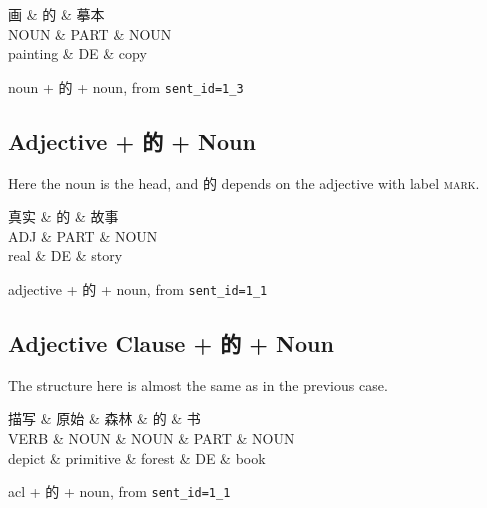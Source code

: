 \documentclass[UTF8,oneside]{book}
\begin{document}
\begin{tree}[h]
\centering
\begin{dependency}[theme=simple]
\begin{deptext}[column sep=.5cm, row sep=.5ex]
画  \& 的  \& 摹本 \\
NOUN \& PART \& NOUN \\
painting \& DE \& copy \\
\end{deptext}
\end{dependency}
\caption{noun + 的 + noun, from \texttt{sent\_id=1\_3}}
\end{tree}

\subsection{Adjective + 的 + Noun}
Here the noun is the head, and 的 depends on the adjective with label \textsc{mark}. 

\begin{tree}[h]
\centering
\begin{dependency}[theme=simple]
\begin{deptext}[column sep=.5cm, row sep=.5ex]
真实  \& 的  \& 故事 \\
ADJ \& PART \& NOUN \\
real \& DE \& story \\
\end{deptext}
\end{dependency}
\caption{adjective + 的 + noun, from \texttt{sent\_id=1\_1}}
\end{tree}

\subsection{Adjective Clause + 的 + Noun}
The structure here is almost the same as in the previous case.

\newpage

\begin{tree}[h]
\centering
\begin{dependency}[theme=simple]
\begin{deptext}[column sep=.5cm, row sep=.5ex]
描写  \& 原始  \& 森林 \& 的 \& 书 \\
VERB \& NOUN \& NOUN \& PART \& NOUN \\
depict \& primitive \& forest \& DE \& book \\
\end{deptext}
\end{dependency}
\caption{acl + 的 + noun, from \texttt{sent\_id=1\_1}}
\end{tree}
\end{document}
